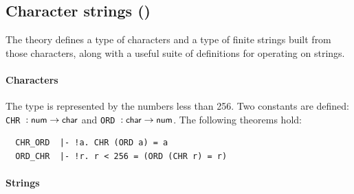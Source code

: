 \subsection{Character strings ()}

The theory  defines a type of characters and a type
of finite strings built from those characters, along with a useful suite of
definitions for operating on strings.

\paragraph {Characters}

The type  is represented by the numbers less than 256. Two
constants are defined: {\small\verb+CHR +}$: \mbox{\small{\textbf{\sf{num}}}}\to\mbox{\small{\textbf{\sf{char}}}}$ and
{\small\verb+ORD +}$: \mbox{\small{\textbf{\sf{char}}}}\to\mbox{\small{\textbf{\sf{num}}}}$. The following theorems
hold:
\begin{hol}
\begin{verbatim}
  CHR_ORD  |- !a. CHR (ORD a) = a
  ORD_CHR  |- !r. r < 256 = (ORD (CHR r) = r)
\end{verbatim}
\end{hol}

\paragraph {Strings}

